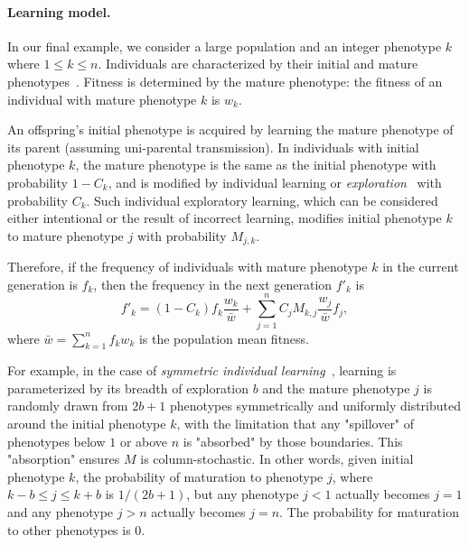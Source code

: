\documentclass[9pt, a4paper, twocolumn]{extarticle}
\begin{document}
\paragraph*{Learning model.}\label{sec:learn_model}

In our final example, we consider a large population and an integer phenotype $k$ where $1 \le k \le n$.
Individuals are characterized by their initial and mature phenotypes~\citep[pg.~94]{Boyd1985}.
Fitness is determined by the mature phenotype: the fitness of an individual with mature phenotype $k$ is $w_k$.

An offspring's initial phenotype is acquired by learning the mature phenotype of its parent (assuming uni-parental transmission).
In individuals with initial phenotype $k$, the mature phenotype is the same as the initial phenotype with probability $1-C_k$, and is modified by individual learning or \emph{exploration}~\citep{Borenstein2008} with probability $C_k$.
Such individual exploratory learning, which can be considered either intentional or the result of incorrect learning, modifies initial phenotype $k$ to mature phenotype $j$ with probability $M_{j,k}$.

Therefore, if the frequency of individuals with mature phenotype $k$ in the current generation is $f_k$, then the frequency in the next generation $f'_k$ is
\begin{equation}
f'_k = (1-C_k) f_k \frac{w_{k}}{\bar{w}} + \sum_{j=1}^{n}{C_j M_{k,j} \frac{w_{j}}{\bar{w}} f_j },
\end{equation}
where $\bar{w} = \sum_{k=1}^{n}{f_k w_{k}}$ is the population mean fitness.

For example, in the case of \emph{symmetric individual learning}~\citep{Borenstein2008}, learning is parameterized by its breadth of exploration $b$ and the mature phenotype $j$ is randomly drawn from $2b+1$ phenotypes symmetrically and uniformly distributed around the initial phenotype $k$, with the limitation that any "spillover" of phenotypes below $1$ or above $n$ is "absorbed" by those boundaries.
This "absorption" ensures $M$ is column-stochastic. 
In other words, given initial phenotype $k$, the probability of maturation to phenotype $j$, where $k-b \le j \le k+b$ is $1/(2b+1)$, but any phenotype $j<1$ actually becomes $j=1$ and any phenotype $j>n$ actually becomes $j=n$.
The probability for maturation to other phenotypes is $0$.
\end{document}
